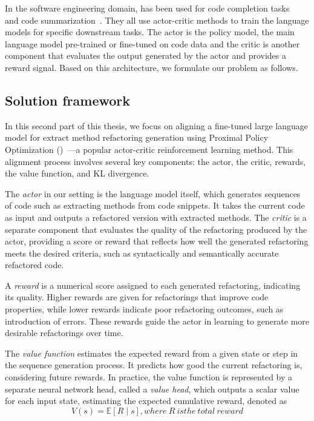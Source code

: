 In the software engineering domain, \rl{} has been used for code completion tasks~\cite{shojaee2023execution, li2024ircoco} and code summarization~\cite{wan2018improving}. They all use actor-critic methods to train the language models for specific downstream tasks. The actor is the policy model, the main language model pre-trained or fine-tuned on code data and the critic is another component that evaluates the output generated by the actor and provides a reward signal. Based on this architecture, we formulate our problem as follows. 


\subsection{Solution framework}

In this second part of this thesis, we focus on aligning a fine-tuned large language model for extract method refactoring generation using Proximal Policy Optimization (\ppo{})~\cite{schulman2017proximal}---a popular actor-critic  reinforcement learning method. 
This alignment process involves several key components: the actor, the critic, rewards, the value function, and KL divergence.

The \textit{actor} in our setting is the language model itself, which generates sequences of code such as extracting methods from code snippets. It takes the current code as input and outputs a refactored version with extracted methods. The \textit{critic} is a separate component that evaluates the quality of the refactoring produced by the actor, providing a score or reward that reflects how well the generated refactoring meets the desired criteria, such as syntactically and semantically accurate refactored code.

A \textit{reward} is a numerical score assigned to each generated refactoring, indicating its quality. Higher rewards are given for refactorings that improve code properties, while lower rewards indicate poor refactoring outcomes, such as introduction of errors. These rewards guide the actor in learning to generate more desirable refactorings over time.

The \textit{value function} estimates the expected reward from a given state or step in the sequence generation process. It predicts how good the current refactoring is, considering future rewards. In practice, the value function is represented by a separate neural network head, called a \textit{value head}, which outputs a scalar value for each input state, estimating the expected cumulative reward, denoted as 
\begin{equation} \label{eq:value_func}
 V(s) = \mathbb{E} \left[ R \mid s \right], where\ R\ is the\ total\ reward
\end{equation}

